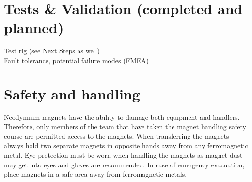 \documentclass[main.tex]{subfiles}
\begin{document}
    \section{Tests \& Validation (completed and planned)}
    Test rig (see Next Steps as well)\\
    Fault tolerance, potential failure modes (FMEA)

    \section{Safety and handling}
    Neodymium magnets have the ability to damage both equipment and handlers. Therefore, only members of the team that have taken the magnet handling safety course are permitted access to the magnets. When transferring the magnets always hold two separate magnets in opposite hands away from any ferromagnetic metal. Eye protection must be worn when handling the magnets as magnet dust may get into eyes and gloves are recommended. In case of emergency evacuation, place magnets in a safe area away from ferromagnetic metals. 
    
\end{document}
